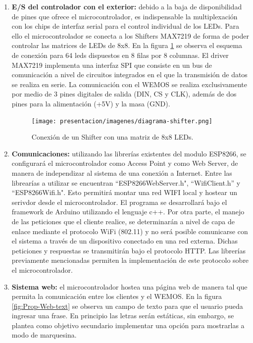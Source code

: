 \begin{enumerate}[label=\alph*.]
    \item \textbf{E/S del controlador con el exterior:} debido a la baja de disponibilidad de pines que ofrece el microcontrolador, es indispensable la multiplexación con los chips de interfaz serial para el control individual de los LEDs. Para ello el microcontrolador se conecta a los Shifters MAX7219 de forma de poder controlar las matrices de LEDs de 8x8. En la figura \ref{fig:Prop-Shifter} se observa el esquema de conexión para 64 leds dispuestos en 8 filas por 8 columnas. El driver MAX7219 implementa una interfaz  SPI que consiste en un bus de comunicación a nivel de circuitos integrados en el que la transmisión de datos se realiza en serie. La comunicación con el WEMOS se realiza exclusivamente por medio de 3 pines digitales de salida (DIN, CS y CLK), además de dos pines para la alimentación (+5V) y la masa (GND).
    
    \begin{figure}[ht]
    	\centering
    	\begin{center}
    		\texttt{[image: presentacion/imagenes/diagrama-shifter.png]}
    		\caption{Conexión de un Shifter con una matriz de 8x8 LEDs.}
    		\label{fig:Prop-Shifter}
    	\end{center}
    \end{figure}
    
    \item \textbf{Comunicaciones:} utilizando las librerías existentes del modulo ESP8266, se configurará el microcontrolador como Access Point y como Web Server, de manera de independizar al sistema de una conexión a Internet. Entre las librearías a utilizar se encuentran ``ESP8266WebServer.h", ``WifiClient.h'' y ``ESP8266Wifi.h". Esto permitirá montar una red WIFI local y hostear un serivdor desde el microcontrolador. El programa se desarrollará bajo el framework de Arduino utilizando el lenguaje c++. Por otra parte, el manejo de las peticiones que el cliente realice, se determinarán a nivel de capa de enlace mediante el protocolo WiFi (802.11) y no será posible comunicarse con el sistema a través de un dispositivo conectado en una red externa. Dichas peticiones y respuestas se transmitirán bajo el protocolo HTTP. Las librerías previamente mencionadas permiten la implementación de este protocolo sobre el microcontrolador.
    
    \item \textbf{Sistema web:} el microcontrolador hostea una página web de manera tal que permita la comunicación entre los clientes y el WEMOS. En la figura \ref{fig:Prop-Web-text} se observa un campo de texto para que el usuario pueda ingresar una frase. En principio las letras serán estáticas, sin embargo, se plantea como objetivo secundario implementar una opción para mostrarlas a modo de marquesina.
    

\end{enumerate}
